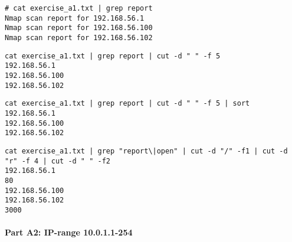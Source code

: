 \begin{lstlisting}[numbers=none, language={}, frame=bt]
# cat exercise_a1.txt | grep report
Nmap scan report for 192.168.56.1
Nmap scan report for 192.168.56.100
Nmap scan report for 192.168.56.102
\end{lstlisting}

\begin{lstlisting}[numbers=none, language={}, frame=bt]
cat exercise_a1.txt | grep report | cut -d " " -f 5
192.168.56.1
192.168.56.100
192.168.56.102
\end{lstlisting}

\begin{lstlisting}[numbers=none, language={}, frame=bt]
cat exercise_a1.txt | grep report | cut -d " " -f 5 | sort
192.168.56.1
192.168.56.100
192.168.56.102
\end{lstlisting}

\begin{lstlisting}[numbers=none, language={}, frame=bt]
cat exercise_a1.txt | grep "report\|open" | cut -d "/" -f1 | cut -d "r" -f 4 | cut -d " " -f2                                              
192.168.56.1
80
192.168.56.100
192.168.56.102
3000
\end{lstlisting}

\paragraph{Part A2: IP-range 10.0.1.1-254}

